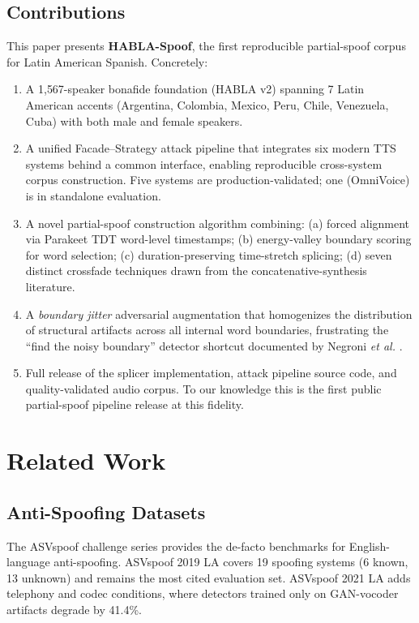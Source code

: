 \documentclass[conference]{IEEEtran}
\begin{document}
\subsection{Contributions}

This paper presents \textbf{HABLA-Spoof}, the first reproducible partial-spoof corpus for Latin American Spanish. Concretely:

\begin{enumerate}
    \item A 1{,}567-speaker bonafide foundation (HABLA v2) spanning 7 Latin American accents (Argentina, Colombia, Mexico, Peru, Chile, Venezuela, Cuba) with both male and female speakers.
    \item A unified Facade--Strategy attack pipeline that integrates six modern TTS systems behind a common interface, enabling reproducible cross-system corpus construction. Five systems are production-validated; one (OmniVoice) is in standalone evaluation.
    \item A novel partial-spoof construction algorithm combining: (a) forced alignment via Parakeet TDT word-level timestamps; (b) energy-valley boundary scoring for word selection; (c) duration-preserving time-stretch splicing; (d) seven distinct crossfade techniques drawn from the concatenative-synthesis literature.
    \item A \emph{boundary jitter} adversarial augmentation that homogenizes the distribution of structural artifacts across all internal word boundaries, frustrating the ``find the noisy boundary'' detector shortcut documented by Negroni \emph{et al.} \cite{negroni2024splicing}.
    \item Full release of the splicer implementation, attack pipeline source code, and quality-validated audio corpus. To our knowledge this is the first public partial-spoof pipeline release at this fidelity.
\end{enumerate}

\section{Related Work}

\subsection{Anti-Spoofing Datasets}

The ASVspoof challenge series \cite{asvspoof2019,asvspoof2021} provides the de-facto benchmarks for English-language anti-spoofing. ASVspoof 2019 LA covers 19 spoofing systems (6 known, 13 unknown) and remains the most cited evaluation set. ASVspoof 2021 LA adds telephony and codec conditions, where detectors trained only on GAN-vocoder artifacts degrade by 41.4\%.
\end{document}
